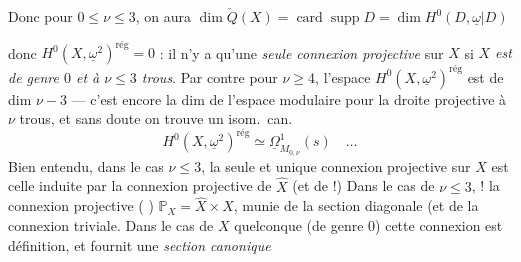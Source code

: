 \documentclass[11pt,a4paper]{article}
\begin{document}
Donc pour $0 \leqslant \nu \leqslant 3$, on aura $\dim \check{Q}(X) = \operatorname{card}\operatorname{supp} D = \dim H^{0}(D, \underline{\omega}|D)$

donc $H^{0}(X, \underline{\omega}^{2})^{\mathrm{rég}} = 0$ : il n'y a qu'une \emph{seule connexion projective}  sur $X$ si \emph{$X$ est de genre $0$ et à $\nu \leqslant 3$ trous}. Par contre pour $\nu \geqslant 4$, l'espace $H^{0}(X, \underline{\omega}^{2})^{\mathrm{rég}}$ est de dim $\nu - 3$ — c'est encore la dim de l'espace modulaire pour la droite projective à $\nu$ trous, et sans doute on trouve un isom.\ can.
\[
H^{0}(X, \underline{\omega}^{2})^{\mathrm{rég}} \simeq \underline{\Omega}^{1}_{M_{0,\nu}}(s) \quad \ldots
\]
Bien entendu, dans le cas $\nu \leqslant 3$, la seule et unique connexion projective sur $X$ est celle induite par la connexion projective de $\hat{X}$ (et \uncertain{\ill{}}   de \uncertain{\ill{}}  !) Dans le cas de $\nu \leqslant 3$, \add{\ill{}}       \uncertain{\ill{}}  ! \struck{\ill{}} la connexion projective  (\struck{\uncertain{\ill{}}} \add{\uncertain{\ill{}}})  $\mathbb{P}_X = \hat{X} \times X$, munie de la section diagonale (et de la connexion triviale. Dans le cas de $X$ quelconque (de genre $0$) cette connexion est  définition, et fournit une \emph{section canonique}
\marginal{\ill{} \ill{} \ill{} \ill{} \ill{} \ill{} \ill{} \ill{}}

\end{document}
